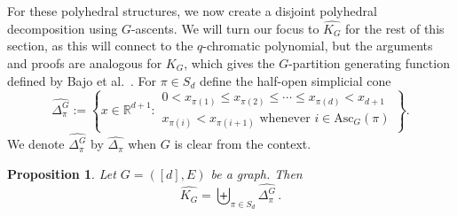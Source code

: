 \documentclass[11pt]{amsart}
\newtheorem{proposition}[theorem]{Proposition}
\newcommand{\asc}{\mathrm{Asc}}
\begin{document}
For these polyhedral structures, we now create a disjoint polyhedral decomposition using $G$-ascents. 
We will turn our focus to $\widehat{K_G}$ for the rest of this section, as this will connect to the $q$-chromatic polynomial, but the arguments and proofs are analogous for $K_G$, which gives the $G$-partition generating function defined by Bajo et al.~\cite{qchromatic}. 
For $\pi \in S_d$ define the half-open simplicial cone
\[
    \widehat{\Delta_\pi^G} := \left\{ x \in \mathbb{R}^{d+1} : 
    \begin{array}{l}
        0 < x_{\pi(1)} \leq x_{\pi(2)} \leq \cdots \leq x_{\pi(d)} < x_{d+1} \\ x_{\pi(i)} < x_{\pi(i+1)} \text{ whenever } i \in \asc_G(\pi)  
    \end{array} \right\}.
\]
We denote $\widehat{\Delta_\pi^G}$ by $\widehat{\Delta_\pi}$ when $G$ is clear from the context. 

\begin{proposition}\label{prop:graphicaldecomposition}
    Let $G = ([d],E)$ be a graph. Then
    \[
        \widehat{K_G} = \biguplus_{\pi \in S_d} \widehat{\Delta_{\pi}^G} \, .
    \]
\end{proposition}
\end{document}
